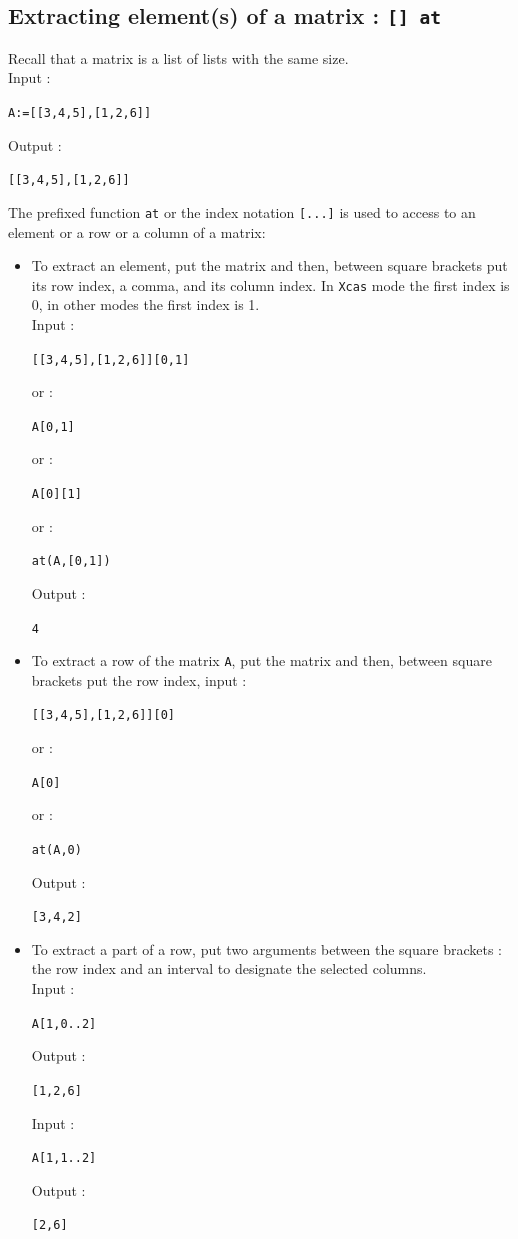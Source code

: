\documentclass[a4paper,11pt]{book}
\begin{document}
\subsection{Extracting element(s) of a matrix : {\tt [] at}}
Recall that a matrix is a list of lists with the same size.\\
Input : 
\begin{center}{\tt A:=[[3,4,5],[1,2,6]]}\end{center}
Output :
\begin{center}{\tt [[3,4,5],[1,2,6]]}\end{center} 
The prefixed function {\tt at} or the 
index notation {\tt [...]} is used to access 
to an element or a row or a column of a matrix:
\begin{itemize}
\item To extract an element, put the matrix and then, between square 
brackets put its row index, a comma, and its column index.
In {\tt Xcas} mode the first index is 0, in other modes the first
index is 1.\\
Input :
\begin{center}{\tt [[3,4,5],[1,2,6]][0,1]}\end{center}
or :
\begin{center}{\tt A[0,1]}\end{center}
or :
\begin{center}{\tt A[0][1]}\end{center}
or :
\begin{center}{\tt at(A,[0,1])}\end{center}
Output :
\begin{center}{\tt 4}\end{center}

\item To extract a row of the matrix {\tt A}, 
put the matrix and then, between 
square brackets put the row index, input :
\begin{center}{\tt  [[3,4,5],[1,2,6]][0]}\end{center}
or :
\begin{center}{\tt A[0]}\end{center}
or :
\begin{center}{\tt at(A,0)}\end{center}
Output :
\begin{center}{\tt [3,4,2]}\end{center}

\item To extract a part of a row, put two arguments 
between the square brackets : 
the row index and an interval to designate the selected columns.\\
Input :
\begin{center}{\tt A[1,0..2]}\end{center}
Output :
\begin{center}{\tt [1,2,6]}\end{center}
Input :
\begin{center}{\tt A[1,1..2]}\end{center}
Output :
\begin{center}{\tt [2,6]}\end{center}


\end{itemize}
\end{document}
